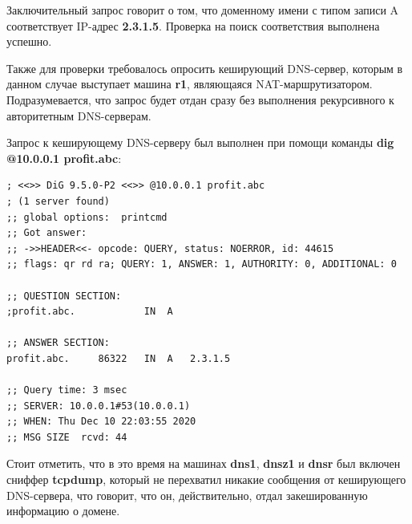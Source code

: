 \documentclass[a4paper,12pt]{article}
\begin{document}
Заключительный запрос говорит о том, что доменному имени с типом записи A соответствует IP-адрес \textbf{2.3.1.5}. Проверка на поиск соответствия выполнена успешно.

Также для проверки требовалось опросить кеширующий DNS-сервер, которым в данном случае выступает машина \textbf{r1}, являющаяся NAT-маршрутизатором. Подразумевается, что запрос будет отдан сразу без выполнения рекурсивного к авторитетным DNS-серверам.

Запрос к кеширующему DNS-серверу был выполнен при помощи команды \textbf{dig @10.0.0.1 profit.abc}:
\begin{verbatim}
; <<>> DiG 9.5.0-P2 <<>> @10.0.0.1 profit.abc
; (1 server found)
;; global options:  printcmd
;; Got answer:
;; ->>HEADER<<- opcode: QUERY, status: NOERROR, id: 44615
;; flags: qr rd ra; QUERY: 1, ANSWER: 1, AUTHORITY: 0, ADDITIONAL: 0

;; QUESTION SECTION:
;profit.abc.			IN	A

;; ANSWER SECTION:
profit.abc.		86322	IN	A	2.3.1.5

;; Query time: 3 msec
;; SERVER: 10.0.0.1#53(10.0.0.1)
;; WHEN: Thu Dec 10 22:03:55 2020
;; MSG SIZE  rcvd: 44
\end{verbatim}

Стоит отметить, что в это время на машинах \textbf{dns1}, \textbf{dnsz1} и \textbf{dnsr} был включен сниффер \textbf{tcpdump}, который не перехватил никакие сообщения от кеширующего DNS-сервера, что говорит, что он, действительно, отдал закешированную информацию о домене.
\end{document}
